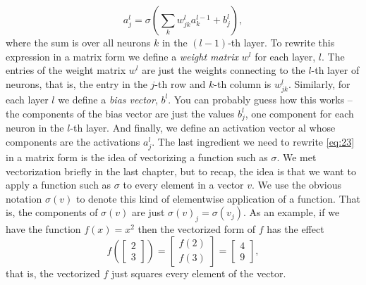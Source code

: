 \documentclass[a4paper,twoside,10pt]{book}
\begin{document}
\begin{equation}
	a^{l}_j = \sigma\left( \sum_k w^{l}_{jk} a^{l-1}_k + b^l_j \right),\tag{23}\label{eq:23}
\end{equation}
where the sum is over all neurons $k$ in the $(l-1)$-th layer. To rewrite this expression in a matrix form we define a \textit{weight matrix} $w^l$ for each layer, $l$. The entries of the weight matrix $w^l$ are just the weights connecting to the $l$-th layer of neurons, that is, the entry in the $j$-th row and $k$-th column is $w^l_{jk}$. Similarly, for each layer $l$ we define a \textit{bias vector}, $b^l$. You can probably guess how this works -- the components of the bias vector are just the values $b^l_j$, one component for each neuron in the $l$-th layer. And finally, we define an activation vector al whose components are the activations $a^l_j$.
The last ingredient we need to rewrite \ref{eq:23} in a matrix form is the idea of vectorizing a function such as $\sigma$. We met vectorization briefly in the last chapter, but to recap, the idea is that we want to apply a function such as $\sigma$ to every element in a vector $v$. We use the obvious notation $\sigma(v)$ to denote this kind of elementwise application of a function. That is, the components of $\sigma(v)$ are just $\sigma(v)_j = \sigma(v_j)$. As an example, if we have the function $f(x)=x^2$ then the vectorized form of $f$ has the effect
\begin{equation}
f\left(\left[ \begin{array}{c} 2 \\ 3 \end{array} \right] \right)
= \left[ \begin{array}{c} f(2) \\ f(3) \end{array} \right]
= \left[ \begin{array}{c} 4 \\ 9 \end{array} \right],
\tag{24}\label{eq:24}
\end{equation}
that is, the vectorized $f$ just squares every element of the vector.
\end{document}
